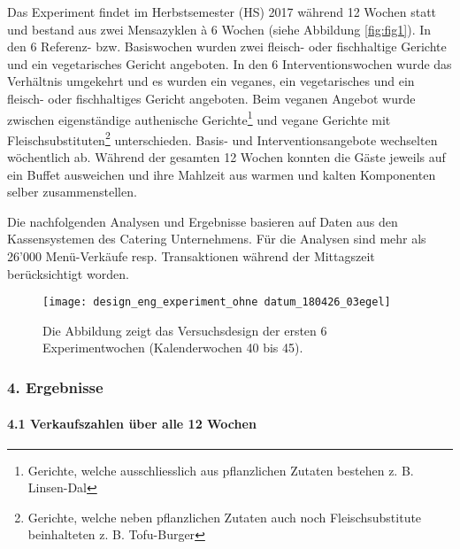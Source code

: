 \documentclass[12pt,ngerman,]{article}
\let\oldparagraph\paragraph
\renewcommand{\paragraph}[1]{\oldparagraph{#1}\mbox{}}
\let\rmarkdownfootnote\footnote%
\def\footnote{\protect\rmarkdownfootnote}
\begin{document}
\par

Das Experiment findet im Herbstsemester (HS) 2017 während 12 Wochen
statt und bestand aus zwei Mensazyklen à 6 Wochen (siehe Abbildung
\ref{fig:fig1}). In den 6 Referenz- bzw. Basiswochen wurden zwei
fleisch- oder fischhaltige Gerichte und ein vegetarisches Gericht
angeboten. In den 6 Interventionswochen wurde das Verhältnis umgekehrt
und es wurden ein veganes, ein vegetarisches und ein fleisch- oder
fischhaltiges Gericht angeboten. Beim veganen Angebot wurde zwischen
eigenständige authenische Gerichte\footnote{Gerichte, welche
  ausschliesslich aus pflanzlichen Zutaten bestehen z. B. Linsen-Dal}
und vegane Gerichte mit Fleischsubstituten\footnote{Gerichte, welche
  neben pflanzlichen Zutaten auch noch Fleischsubstitute beinhalteten z.
  B. Tofu-Burger} unterschieden. Basis- und Interventionsangebote
wechselten wöchentlich ab. Während der gesamten 12 Wochen konnten die
Gäste jeweils auf ein Buffet ausweichen und ihre Mahlzeit aus warmen und
kalten Komponenten selber zusammenstellen.

\par

Die nachfolgenden Analysen und Ergebnisse basieren auf Daten aus den
Kassensystemen des Catering Unternehmens. Für die Analysen sind mehr als
26'000 Menü-Verkäufe resp. Transaktionen während der Mittagszeit
berücksichtigt worden.

\begin{figure}[H]

{\centering \texttt{[image: design\_eng\_experiment\_ohne datum\_180426\_03egel]} 

}

\caption{\label{fig:fig1} Die Abbildung zeigt das Versuchsdesign der ersten 6 Experimentwochen (Kalenderwochen 40 bis 45).}\label{fig:unnamed-chunk-1}
\end{figure}

\hypertarget{ergebnisse}{%
\subsubsection{4. Ergebnisse}\label{ergebnisse}}

\hypertarget{verkaufszahlen-uber-alle-12-wochen}{%
\paragraph{4.1 Verkaufszahlen über alle 12
Wochen}\label{verkaufszahlen-uber-alle-12-wochen}}
\end{document}
